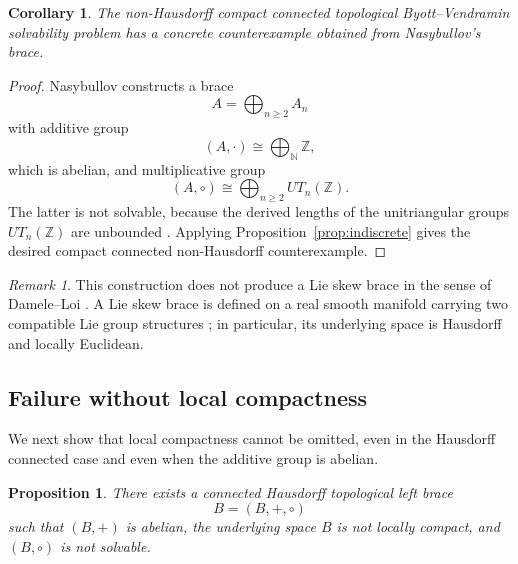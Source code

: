 \documentclass[reqno]{amsart}
\numberwithin{equation}{section}
\newtheorem{proposition}[theorem]{Proposition}
\newtheorem{corollary}[theorem]{Corollary}
\theoremstyle{definition}
\theoremstyle{remark}
\newtheorem{remark}[theorem]{Remark}
\newcommand{\Z}{\mathbb Z}
\begin{document}
\begin{corollary}\label{cor:nasybullov}
The non-Hausdorff compact connected topological Byott--Vendramin solvability
problem has a concrete counterexample obtained from Nasybullov's brace.
\end{corollary}

\begin{proof}
Nasybullov constructs a brace
\[
A=\bigoplus_{n\ge 2} A_n
\]
with additive group
\[
(A,\cdot)\cong \bigoplus_{\mathbb N}\Z,
\]
which is abelian, and multiplicative group
\[
(A,\circ)\cong \bigoplus_{n\ge 2} UT_n(\Z).
\]
The latter is not solvable, because the derived lengths of the unitriangular
groups $UT_n(\Z)$ are unbounded \cite[Example~3.2]{Nasybullov}. Applying
Proposition~\ref{prop:indiscrete} gives the desired compact connected
non-Hausdorff counterexample.
\end{proof}

\begin{remark}
This construction does not produce a Lie skew brace in the sense of
Damele--Loi \cite{DameleLoi2026}. A Lie skew brace is defined on a real smooth manifold carrying two
compatible Lie group structures \cite{DameleLoi2026}; in particular, its underlying
space is Hausdorff and locally Euclidean.
\end{remark}


\subsection{Failure without local compactness}\label{subsec:non-locally-compact}

We next show that local compactness cannot be omitted, even in the Hausdorff
connected case and even when the additive group is abelian.

\begin{proposition}\label{prop:banach-counterexample}
There exists a connected Hausdorff topological left brace
\[
B=(B,+,\circ)
\]
such that $(B,+)$ is abelian, the underlying space $B$ is not locally compact,
and $(B,\circ)$ is not solvable.
\end{proposition}
\end{document}
